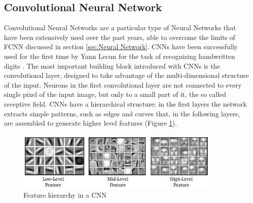 \subsection{Convolutional Neural Network}
\label{sec:convolutional_neural_network}
Convolutional Neural Networks are a particular type of Neural Networks that have been extensively used over the past years, able to overcome the limits of \ac{FCNN} discussed in section \ref{sec:Neural Network}. \acp{CNN} have been successfully used for the first time by Yann Lecun for the task of recognizing handwritten digits \cite{lecun}.
The most important building block introduced with \acp{CNN} is the convolutional layer, designed to take advantage of the multi-dimensional structure of the input. Neurons in the first convolutional layer are not connected to every single pixel of the input image, but only to a small part of it, the so called receptive field. \acp{CNN} have a hierarchical structure: in the first layers the network extracts simple patterns, such as edges and curves that, in the following layers, are assembled to generate higher level features (Figure \ref{fig:fourth_figure}).
\begin{figure}[htbp!]
\centering
\includegraphics[width=0.90\textwidth]{Tesi/images/Feature}
\caption{Feature hierarchy in a \ac{CNN}}
\label{fig:fourth_figure}
\end{figure}

